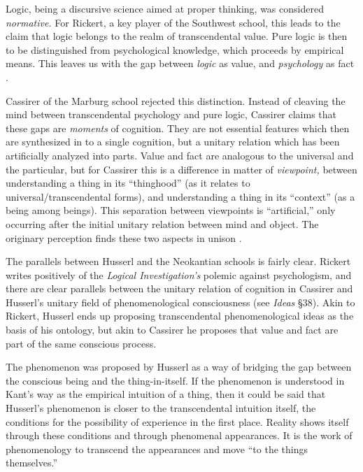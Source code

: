 \documentclass[leqno, 12pt]{turabian-researchpaper}
\begin{document}
	Logic, being a discursive science aimed at proper thinking, was considered
	\emph{normative.} For Rickert, a key player of the Southwest school, this leads
	to the claim that logic belongs to the realm of transcendental value. Pure
	logic is then to be distinguished from psychological knowledge, which proceeds
	by empirical means. This leaves us with the gap between \emph{logic} as value,
	and \emph{psychology} as fact \autocite[34ff]{friedman2000}.

	Cassirer of the Marburg school rejected this distinction. Instead of cleaving
	the mind between transcendental psychology and pure logic, Cassirer claims that
	these gaps are \emph{moments} of cognition. They are not essential features which
	then are synthesized in to a single cognition, but a unitary relation which
	has been artificially analyzed into parts. Value and fact are analogous to the
	universal and the particular, but for Cassirer this is a difference in matter
	of \emph{viewpoint,} between understanding a thing in its \enquote{thinghood}
	(as it relates to universal/transcendental forms), and understanding a thing in
	its \enquote{context} (as a being among beings). This separation between viewpoints
	is \enquote{artificial,} only occurring after the initial unitary relation
	between mind and object. The originary perception finds these two aspects in unison
	\autocite[34ff]{friedman2000}.

	The parallels between Husserl and the Neokantian schools is fairly clear.
	Rickert writes positively of the \textit{Logical Investigation's}\nocite{husserl2005}
	polemic against psychologism, and there are clear parallels between the
	unitary relation of cognition in Cassirer and Husserl's unitary field of
	phenomenological consciousness (see \textit{Ideas} \S38)\nocite{husserl2012}. Akin
	to Rickert, Husserl ends up proposing transcendental phenomenological ideas as
	the basis of his ontology, but akin to Cassirer he proposes that value and fact
	are part of the same conscious process.

	The phenomenon was proposed by Husserl as a way of bridging the gap between the
	conscious being and the thing-in-itself. If the phenomenon is understood in
	Kant's way as the empirical intuition of a thing, then it could be said that Husserl's
	phenomenon is closer to the transcendental intuition itself, the conditions
	for the possibility of experience in the first place. Reality shows itself through
	these conditions and through phenomenal appearances. It is the work of
	phenomenology to transcend the appearances and move \enquote{to the things themselves.}
\end{document}
